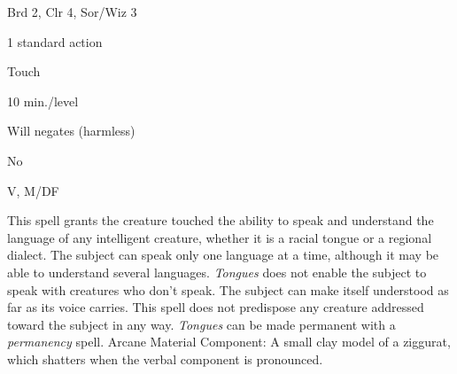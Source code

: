 
\begin{description*}
\item[Level:] Brd 2, Clr 4, Sor/Wiz 3
\item[Casting Time:] 1 standard action
\item[Range:] Touch
\item[Duration:] 10 min./level
\item[Saving Throw:] Will negates (harmless)
\item[Spell Resistance:] No
\item[Components:] V, M/DF
\end{description*}

This spell grants the creature touched the ability to speak and understand the
language of any intelligent creature, whether it is a racial tongue or a regional
dialect. The subject can speak only one language at a time, although it may be
able to understand several languages. \textit{Tongues} does not enable the subject
to speak with creatures who don't speak. The subject can make itself understood
as far as its voice carries. This spell does not predispose any creature addressed
toward the subject in any way.
\textit{Tongues} can be made permanent with a \textit{permanency} spell.
Arcane Material Component: A small clay model of a ziggurat, which shatters
when the verbal component is pronounced.